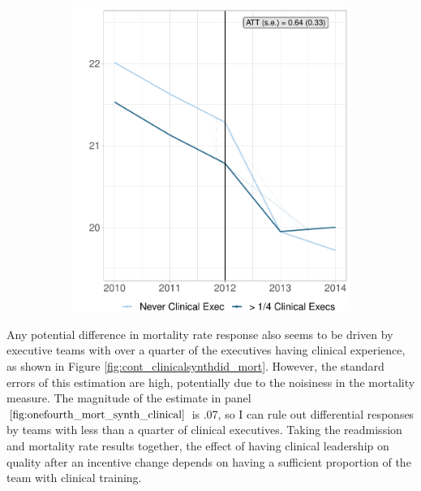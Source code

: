 \documentclass[12pt]{article}
\begin{document}
\begin{figure}[ht!]
\begin{subfigure}[b]{0.45\textwidth}
         \includegraphics[width=\textwidth]{Objects/cont_onehalfread_md_nomd_synth_graph.pdf}
         \label{fig:onehalf_read_synth_clinical}
     \end{subfigure}
        \label{fig:cont_clinicalsynthdid}
    \end{figure}

    Any potential difference in mortality rate response also seems to be driven by executive teams with over a quarter of the executives having clinical experience, as shown in Figure \ref{fig:cont_clinicalsynthdid_mort}. However, the standard errors of this estimation are high, potentially due to the noisiness in the mortality measure. The magnitude of the estimate in panel $\ref{fig:onefourth_mort_synth_clinical}$ is .07, so I can rule out differential responses by teams with less than a quarter of clinical executives. Taking the readmission and mortality rate results together, the effect of having clinical leadership on quality after an incentive change depends on having a sufficient proportion of the team with clinical training. 
\end{document}
